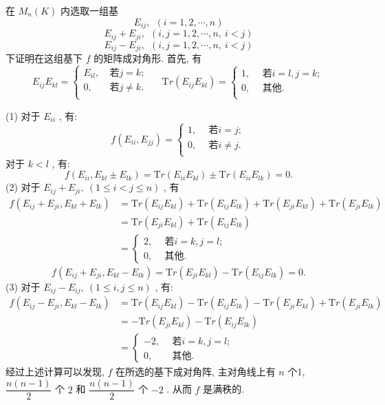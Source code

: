 \documentclass[11pt,a4paper,openany,oneside]{book}
\newcommand{\Tr}{\mathrm Tr}
\begin{document}
在 $ M_n(K) $ 内选取一组基
 $$  E_{ij}, \ \ (i=1, 2, \cdots, n)  $$ 
 $$  E_{ij} + E_{ji}, \ \ (i,j =1,2, \cdots, n, \ i < j)  $$ 
 $$  E_{ij} - E_{ji}, \ \ (i,j =1,2, \cdots, n, \ i < j)  $$ 
下证明在这组基下 $ f $ 的矩阵成对角形. 首先, 有
\begin{equation}
E_{ij}E_{kl} = \left\{
\begin{aligned}
E_{il}, \ &\text{若} j=k;\\
0, \ \ &\text{若} j \neq k. \\
\end{aligned}
\right. \ \ \ \ \ \ 
\Tr(E_{ij}E_{kl}) = \left\{
\begin{aligned}
1, \ \ &\text{若}i=l, j=k; \\
0, \ \ &\text{其他}. \\
\end{aligned}
\right.
\end{equation}

(1) 对于 $ E_{ii} $ , 有:
\begin{equation}
f(E_{ii}, E_{jj}) = \left\{
\begin{aligned}
1, \ \ &\text{若}i=j; \\
0, \ \ &\text{若}i\neq j. \\
\end{aligned}
\right.
\end{equation}
对于 $ k < l $ , 有:
 $$  f(E_{ii}, E_{kl} \pm E_{lk}) = \Tr(E_{ii}E_{kl}) \pm \Tr(E_{ii}E_{lk}) = 0.  $$ 
(2) 对于 $ E_{ij} + E_{ji}, \ (1 \leq i < j \leq n) $ , 有
\begin{align*}
f(E_{ij}+E_{ji}, E_{kl}+E_{lk}) &= \Tr(E_{ij}E_{kl}) + \Tr(E_{ij}E_{lk}) + \Tr(E_{ji}E_{kl}) + \Tr(E_{ji}E_{lk}) \\
&= \Tr(E_{ji}E_{kl}) + \Tr(E_{ij}E_{lk}) \\
&=\left\{
\begin{aligned}
2, \ \ &\text{若}i=k, j=l; \\
0, \ \ &\text{其他}.
\end{aligned}
\right.
\end{align*}
 $$  f(E_{ij}+E_{ji}, E_{kl}- E_{lk}) = \Tr(E_{ji}E_{kl}) - \Tr(E_{ij}E_{lk}) = 0.  $$ 
(3) 对于 $ E_{ij} - E_{ij}, \ (1 \leq i, j \leq n) $ , 有:
\begin{align*}
f(E_{ij}-E_{ji}, E_{kl}-E_{lk}) &= \Tr(E_{ij}E_{kl}) - \Tr(E_{ij}E_{lk}) - \Tr(E_{ji}E_{kl}) + \Tr(E_{ji}E_{lk}) \\
&= -\Tr(E_{ji}E_{kl}) - \Tr(E_{ij}E_{lk}) \\
&=\left\{
\begin{aligned}
-2, \ \ &\text{若}i=k, j=l; \\
0, \ \ &\text{其他}.
\end{aligned}
\right.
\end{align*}
经过上述计算可以发现,  $ f $ 在所选的基下成对角阵, 主对角线上有 $ n $ 个1,  $ \dfrac{n(n-1)}{2} $ 个 $ 2 $ 和 $ \dfrac{n(n-1)}{2} $ 个 $ -2 $ . 从而 $ f $ 是满秩的. \\  \\  \\  
\end{document}
